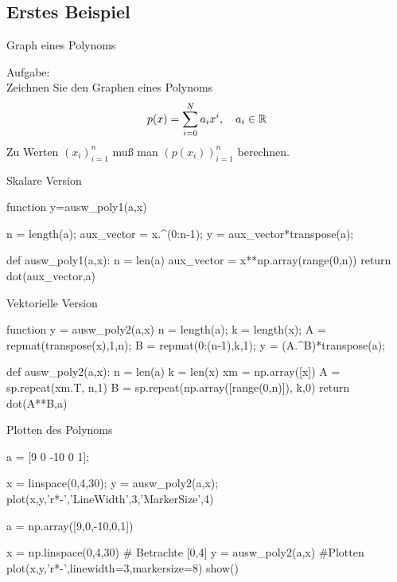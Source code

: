 \documentclass[hyperref={xetex}]{beamer}
\begin{document}
\subsection{Erstes Beispiel}
\begin{frame}[fragile]{Graph eines Polynoms}

\alert{Aufgabe:}\\
Zeichnen Sie  den Graphen eines Polynoms
\vspace*{-0.4cm}
\[ p(x)= \sum_{i=0}^N a_i x^i, \quad a_i \in \mathbb{R} 
\vspace*{-0.4cm} \]
Zu Werten $(x_i)_{i=1}^n$ muß man $(p(x_i))_{i=1}^n$ berechnen.

\end{frame}

\begin{frame}[fragile]{Skalare Version}
\begin{matlabin}[title=\tiny matlab]
function y=ausw_poly1(a,x)

n = length(a);
aux_vector = x.^(0:n-1);
y = aux_vector*transpose(a);
\end{matlabin}
\begin{pyin}[title=\tiny python]
def ausw_poly1(a,x):
    n = len(a)
    aux_vector = x**np.array(range(0,n))
    return dot(aux_vector,a)
\end{pyin}


\end{frame}
\begin{frame}[fragile]{Vektorielle Version}
\begin{matlabin}[title=\tiny matlab]
function y = ausw_poly2(a,x)
n = length(a);
k = length(x);
A = repmat(transpose(x),1,n);
B = repmat(0:(n-1),k,1);
y = (A.^B)*transpose(a);
\end{matlabin}
\begin{pyin}[title=\tiny python]
def ausw_poly2(a,x):
    n = len(a)
    k = len(x)
    xm = np.array([x])
    A = sp.repeat(xm.T, n,1)
    B = sp.repeat(np.array([range(0,n)]), k,0)
    return dot(A**B,a)
\end{pyin}
\end{frame}
\begin{frame}[fragile]{Plotten des Polynoms}
\begin{matlabin}[title=\tiny matlab]
a = [9 0 -10 0 1]; %

x = linspace(0,4,30); %
y = ausw_poly2(a,x);
plot(x,y,'r*-','LineWidth',3,'MarkerSize',4)
\end{matlabin}
\begin{pyin}[title=\tiny python]
a = np.array([9,0,-10,0,1])

x = np.linspace(0,4,30) # Betrachte [0,4]
y = ausw_poly2(a,x)
#Plotten
plot(x,y,'r*-',linewidth=3,markersize=8)
show()
\end{pyin}
\end{frame}
\end{document}
